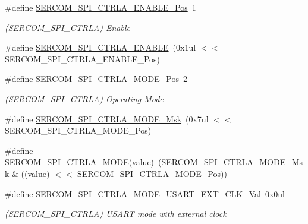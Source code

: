 \begin{DoxyCompactItemize}
\item 
\#define \mbox{\hyperlink{group___s_a_m_d21___s_e_r_c_o_m_gafef9eef9895fd5eac72b62e67bcb1e28}{S\+E\+R\+C\+O\+M\+\_\+\+S\+P\+I\+\_\+\+C\+T\+R\+L\+A\+\_\+\+E\+N\+A\+B\+L\+E\+\_\+\+Pos}}~1
\begin{DoxyCompactList}\small\item\em (S\+E\+R\+C\+O\+M\+\_\+\+S\+P\+I\+\_\+\+C\+T\+R\+LA) Enable \end{DoxyCompactList}\item 
\#define \mbox{\hyperlink{group___s_a_m_d21___s_e_r_c_o_m_gaab65a8369b1c5cbe42dc2d2a15be5a20}{S\+E\+R\+C\+O\+M\+\_\+\+S\+P\+I\+\_\+\+C\+T\+R\+L\+A\+\_\+\+E\+N\+A\+B\+LE}}~(0x1ul $<$$<$ S\+E\+R\+C\+O\+M\+\_\+\+S\+P\+I\+\_\+\+C\+T\+R\+L\+A\+\_\+\+E\+N\+A\+B\+L\+E\+\_\+\+Pos)
\item 
\#define \mbox{\hyperlink{group___s_a_m_d21___s_e_r_c_o_m_ga52c079d744ef9c07762c97548eea6c8d}{S\+E\+R\+C\+O\+M\+\_\+\+S\+P\+I\+\_\+\+C\+T\+R\+L\+A\+\_\+\+M\+O\+D\+E\+\_\+\+Pos}}~2
\begin{DoxyCompactList}\small\item\em (S\+E\+R\+C\+O\+M\+\_\+\+S\+P\+I\+\_\+\+C\+T\+R\+LA) Operating Mode \end{DoxyCompactList}\item 
\#define \mbox{\hyperlink{group___s_a_m_d21___s_e_r_c_o_m_ga980f7f9c2bf7e9b43a87be4ba5a92dac}{S\+E\+R\+C\+O\+M\+\_\+\+S\+P\+I\+\_\+\+C\+T\+R\+L\+A\+\_\+\+M\+O\+D\+E\+\_\+\+Msk}}~(0x7ul $<$$<$ S\+E\+R\+C\+O\+M\+\_\+\+S\+P\+I\+\_\+\+C\+T\+R\+L\+A\+\_\+\+M\+O\+D\+E\+\_\+\+Pos)
\item 
\#define \mbox{\hyperlink{group___s_a_m_d21___s_e_r_c_o_m_gad502c42221bf95cd69a4eca7a5c77148}{S\+E\+R\+C\+O\+M\+\_\+\+S\+P\+I\+\_\+\+C\+T\+R\+L\+A\+\_\+\+M\+O\+DE}}(value)~(\mbox{\hyperlink{group___s_a_m_d21___s_e_r_c_o_m_ga980f7f9c2bf7e9b43a87be4ba5a92dac}{S\+E\+R\+C\+O\+M\+\_\+\+S\+P\+I\+\_\+\+C\+T\+R\+L\+A\+\_\+\+M\+O\+D\+E\+\_\+\+Msk}} \& ((value) $<$$<$ \mbox{\hyperlink{group___s_a_m_d21___s_e_r_c_o_m_ga52c079d744ef9c07762c97548eea6c8d}{S\+E\+R\+C\+O\+M\+\_\+\+S\+P\+I\+\_\+\+C\+T\+R\+L\+A\+\_\+\+M\+O\+D\+E\+\_\+\+Pos}}))
\item 
\#define \mbox{\hyperlink{group___s_a_m_d21___s_e_r_c_o_m_ga2f03b0814d0e960f9a60891dcb8bc933}{S\+E\+R\+C\+O\+M\+\_\+\+S\+P\+I\+\_\+\+C\+T\+R\+L\+A\+\_\+\+M\+O\+D\+E\+\_\+\+U\+S\+A\+R\+T\+\_\+\+E\+X\+T\+\_\+\+C\+L\+K\+\_\+\+Val}}~0x0ul
\begin{DoxyCompactList}\small\item\em (S\+E\+R\+C\+O\+M\+\_\+\+S\+P\+I\+\_\+\+C\+T\+R\+LA) U\+S\+A\+RT mode with external clock \end{DoxyCompactList}\item 
$$
\end{DoxyCompactItemize}
